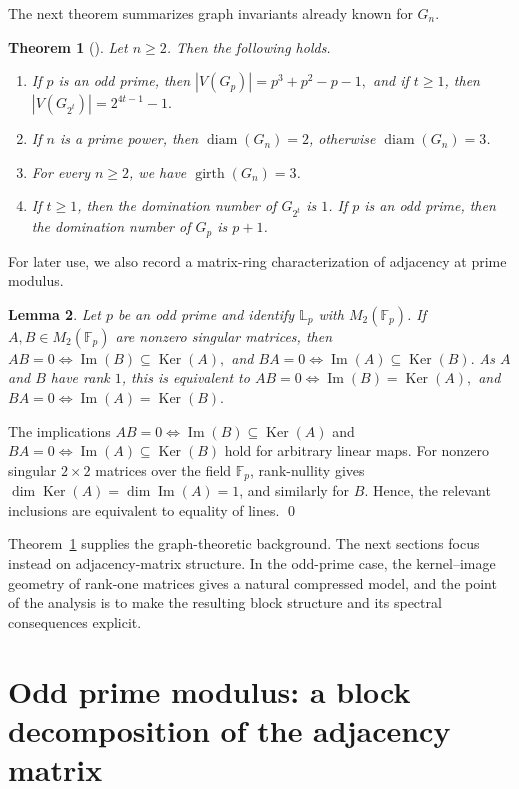 \documentclass[12pt]{article}
\renewenvironment{proof}{{\bf \noindent Proof.}}{\qed}
\newtheorem{theorem}{Theorem}[section]
\newtheorem{lemma}[theorem]{Lemma}
\theoremstyle{definition}
\newcommand{\F}{\mathbb{F}}
\newcommand{\LL}{\mathbb{L}}
\newcommand{\Ker}{\operatorname{Ker}}
\newcommand{\Image}{\operatorname{Im}}
\newcommand{\diam}{\operatorname{diam}}
\newcommand{\girth}{\operatorname{girth}}
\begin{document}
	
	\medskip
	The next theorem summarizes graph invariants already known for $G_n$.
	\begin{theorem}[\cite{grau2017}]\label{thm:known}
		Let $n\ge 2$. Then the following holds.
		\begin{enumerate}[label=\textup{(\roman*)},noitemsep]
			\item If $p$ is an odd prime, then $|V(G_p)|=p^3+p^2-p-1,$ and if $t\ge 1$, then
			$|V(G_{2^t})|=2^{4t-1}-1.$ 
			\item If $n$ is a prime power, then $\diam(G_n)=2$, otherwise $\diam(G_n)=3$.
			\item For every $n\ge 2$, we have  $\girth(G_n)=3$.
			\item If $t\ge 1$, then the domination number of $G_{2^t}$ is $1$. If $p$ is an odd prime, then the domination number of $G_p$ is $p+1$.
		\end{enumerate}
	\end{theorem}
	
	\medskip
	For later use, we also record a matrix-ring characterization of adjacency at prime modulus.
	\begin{lemma}\label{lem:rankoneadj}
		Let $p$ be an odd prime and identify $\LL_p$ with $M_2(\F_p)$. If $A,B\in M_2(\F_p)$ are nonzero singular matrices, then
		$AB=0 \iff \Image(B)\subseteq \Ker(A),$ and $BA=0 \iff \Image(A)\subseteq \Ker(B).$ As $A$ and $B$ have rank $1$, this is equivalent to $AB=0 \iff \Image(B)=\Ker(A),$ and $BA=0 \iff \Image(A)=\Ker(B).$
	\end{lemma}
	
	\begin{proof}
		The implications $AB=0\iff \Image(B)\subseteq \Ker(A)$ and $BA=0\iff \Image(A)\subseteq \Ker(B)$ hold for arbitrary linear maps. For nonzero singular $2\times 2$ matrices over the field $\F_p$, rank-nullity gives $\dim\Ker(A)=\dim\Image(A)=1$, and similarly for $B$. Hence, the relevant inclusions are equivalent to equality of lines.
	\end{proof}
	
	\medskip
	Theorem~\ref{thm:known} supplies the graph-theoretic background. The next sections focus instead on adjacency-matrix structure. In the odd-prime case, the kernel--image geometry of rank-one matrices gives a natural compressed model, and the point of the analysis is to make the resulting block structure and its spectral consequences explicit.
	
	\section{Odd prime modulus: a block decomposition of the adjacency matrix}\label{sec:oddprime}
	
\end{document}
